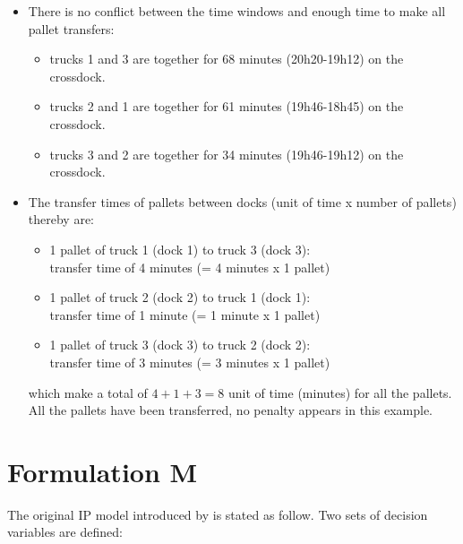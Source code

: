 \documentclass[preprint,12pt,authoryear]{elsarticle}
\begin{document}
\begin{itemize}
    
    \item There is no conflict between the time windows and enough time to make all pallet transfers:
        \begin{itemize}
        \item trucks 1 and 3 are together for 68 minutes (20h20-19h12) on the crossdock.

        \item trucks 2 and 1 are together for 61 minutes (19h46-18h45) on the crossdock.

        \item trucks 3 and 2 are together for 34 minutes (19h46-19h12) on the crossdock.
        \end{itemize}


    \item The transfer times of pallets between docks (unit of time x number of pallets) thereby are: 
    
        \begin{itemize}
        \item 1 pallet of truck 1 (dock 1) to truck 3 (dock 3): \\
        transfer time of 4 minutes (= 4 minutes  x 1 pallet)

        \item 1 pallet of truck 2 (dock 2) to truck 1 (dock 1): \\
        transfer time of 1 minute (= 1 minute  x 1 pallet)

        \item 1 pallet of truck 3 (dock 3) to truck 2 (dock 2): \\
        transfer time of 3 minutes (= 3 minutes x 1 pallet)
        \end{itemize}

        which make a total of $4 + 1 + 3 = 8$ unit of time (minutes) for all the pallets. All the pallets have been transferred, no penalty appears in this example.

\end{itemize}

%
%
\section{Formulation M}\label{sec:FormulationM}


The original IP model introduced by \cite{MIAO2009} is stated as follow.
%
Two sets of decision variables are defined:
\medskip
\end{document}
